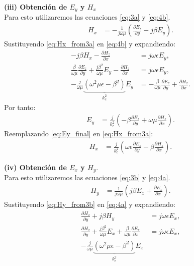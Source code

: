 \documentclass[
  11pt,
  letterpaper,
   addpoints,
   answers
  ]{exam}
\begin{document}
\begin{questions}
\begin{parts}
\begin{solution}
\noindent
\begin{minipage}[t]{0.47\linewidth}
\textbf{(iii) Obtención de $E_y$ y $H_x$}\\
Para esto utilizaremos las ecuaciones \eqref{eq:3a} y \eqref{eq:4b}.
\begin{align}
H_x&=-\frac{1}{j\omega\mu}\left(\frac{\partial E_z}{\partial y}+j\beta E_y\right).
\label{eq:Hx_from3a}
\end{align}
Sustituyendo \eqref{eq:Hx_from3a} en \eqref{eq:4b} y expandiendo:
\begin{align*}
-j\beta H_x-\frac{\partial H_z}{\partial x}&=j\omega\epsilon E_y,\\
\frac{\beta}{\omega\mu}\frac{\partial E_z}{\partial y}+\frac{j\beta^2}{\omega\mu}E_y-\frac{\partial H_z}{\partial x}
&=j\omega\epsilon E_y,\\
-\frac{j}{\omega\mu}\underbrace{(\omega^2\mu\epsilon-\beta^2)}_{k_c^2}E_y
&=-\frac{\beta}{\omega\mu}\frac{\partial E_z}{\partial y}+\frac{\partial H_z}{\partial x}.
\end{align*}
Por tanto:
\begin{align}
E_y&=\frac{j}{k_c^2}\left(-\beta\frac{\partial E_z}{\partial y}+\omega\mu\frac{\partial H_z}{\partial x}\right).
\label{eq:Ey_final}
\end{align}
Reemplazando \eqref{eq:Ey_final} en \eqref{eq:Hx_from3a}:
\begin{align}
H_x&=\frac{j}{k_c^2}\left(\omega\epsilon\frac{\partial E_z}{\partial y}-\beta\frac{\partial H_z}{\partial x}\right).
\label{eq:Hx_final}
\end{align}
\end{minipage}%
\hfill
\begin{minipage}[t]{0.49\linewidth}
\textbf{(iv) Obtención de $E_x$ y $H_y$}.\\
Para esto utilizaremos las ecuaciones \eqref{eq:3b} y \eqref{eq:4a}.
\begin{align}
H_y&=\frac{1}{j\omega\mu}\left(j\beta E_x+\frac{\partial E_z}{\partial x}\right).
\label{eq:Hy_from3b}
\end{align}
Sustituyendo \eqref{eq:Hy_from3b} en \eqref{eq:4a} y expandiendo:
\begin{align*}
\frac{\partial H_z}{\partial y}+j\beta H_y&=j\omega\epsilon E_x,\\
\frac{\partial H_z}{\partial y}+\frac{j\beta^2}{\omega\mu}E_x+\frac{\beta}{\omega\mu}\frac{\partial E_z}{\partial x}
&=j\omega\epsilon E_x,\\
-\frac{j}{\omega\mu}\underbrace{(\omega^2\mu\epsilon-\beta^2)}_{k_c^2}E_x

\end{align*}
\end{minipage}
\end{solution}
\end{parts}
\end{questions}
\end{document}
